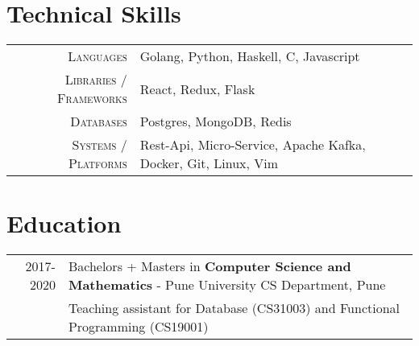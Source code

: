 \documentclass[a4paper,10pt]{extarticle} %
\begin{document}

\vspace{0.1cm}
\section{\textcolor{primary}{Technical Skills}}

\begin{tabular}{r|p{15cm}}
\textsc{Languages} & Golang, Python, Haskell, C, Javascript\\
\textsc{Libraries / Frameworks} & React, Redux, Flask\\
\textsc{Databases} & Postgres, MongoDB, Redis\\
\textsc{Systems / Platforms} & Rest-Api, Micro-Service, Apache Kafka, Docker, Git, Linux, Vim\\
\end{tabular}


\vspace{0.1cm}
\section{\textcolor{primary}{Education}}

\begin{tabular}{r|p{17.5cm}}	
\textsc{2017-2020} & Bachelors + Masters in \textbf{Computer Science and Mathematics} - Pune University CS Department, Pune\\
&Teaching assistant for Database (CS31003) and Functional Programming (CS19001)\\
\end{tabular}
\end{document}
